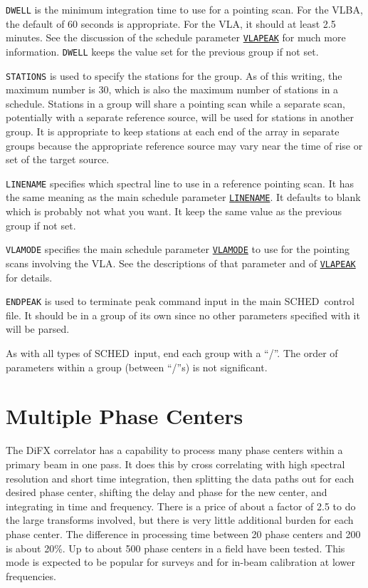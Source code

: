 \documentclass{report}
\newcommand{\schedb}{{\sc SCHED~}}
\begin{document}
\begin{list}{}{\parsep 0em  \itemsep 0em }
\item {\tt DWELL} is the minimum integration time to use for a pointing
scan.  For the VLBA, the default of 60 seconds is appropriate.  For the
VLA, it should at least 2.5 minutes.  See the discussion of the schedule parameter
{\hyperref[MP:VLAPEAK]{{\tt VLAPEAK}}} for much more information.
{\tt DWELL} keeps the value set for the previous group if not set.

\item {\tt STATIONS} is used to specify the stations for the group.
As of this writing, the maximum number is 30, which is also the maximum
number of stations in a schedule.  Stations in a group will share a
pointing scan while a separate scan, potentially with a separate
reference source, will be used for stations in another group.  It
is appropriate to keep stations at each end of the array in separate
groups because the appropriate reference source may vary near
the time of rise or set of the target source.

\item {\tt LINENAME} specifies which spectral line to use in a reference
pointing scan.  It has the same meaning as the main schedule parameter
{\hyperref[MP:LINENAME]{{\tt LINENAME}}}.  It defaults to blank which is
probably not what you want.  It keep the same value as the previous
group if not set.

\item {\tt VLAMODE} specifies the main schedule parameter
{\hyperref[MP:VLAMODE]{{\tt VLAMODE}}} to use for the pointing scans
involving the VLA.  See the descriptions of that parameter and of
{\hyperref[MP:VLAPEAK]{{\tt VLAPEAK}}} for details.

\item {\tt ENDPEAK} is used to terminate peak command input in the
main \schedb control file.  It should be in a group of its own since
no other parameters specified with it will be parsed.

\end{list}

As with all types of \schedb input, end each group with a ``/''.  The
order of parameters within a group (between ``/''s) is not significant.

\section{\label{SEC:MULTIPLE_CENTERS}Multiple Phase Centers}

The DiFX correlator has a capability to process many phase centers
within a primary beam in one pass.  It does this by cross correlating
with high spectral resolution and short time integration, then
splitting the data paths out for each desired phase center, shifting
the delay and phase for the new center, and integrating in time and
frequency.  There is a price of about a factor of 2.5 to do the
large transforms involved, but there is very little additional burden
for each phase center.  The difference in processing time between 20
phase centers and 200 is about 20\%.  Up to about 500 phase centers in
a field have been tested.  This mode is expected to be popular for
surveys and for in-beam calibration at lower frequencies.
\end{document}

